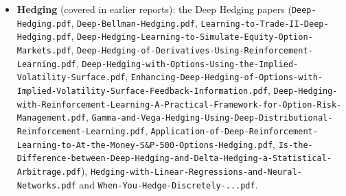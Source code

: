 \documentclass{article}
\begin{document}
\begin{itemize}

\item \textbf{Hedging} (covered in earlier reports): the Deep Hedging papers (\texttt{Deep-\allowbreak{}Hedging.\allowbreak{}pdf}, \texttt{Deep-\allowbreak{}Bellman-\allowbreak{}Hedging.\allowbreak{}pdf}, \texttt{Learning-\allowbreak{}to-\allowbreak{}Trade-\allowbreak{}II-\allowbreak{}Deep-\allowbreak{}Hedging.\allowbreak{}pdf}, \texttt{Deep-\allowbreak{}Hedging-\allowbreak{}Learning-\allowbreak{}to-\allowbreak{}Simulate-\allowbreak{}Equity-\allowbreak{}Option-\allowbreak{}Markets.\allowbreak{}pdf}, \texttt{Deep-\allowbreak{}Hedging-\allowbreak{}of-\allowbreak{}Derivatives-\allowbreak{}Using-\allowbreak{}Reinforcement-\allowbreak{}Learning.\allowbreak{}pdf}, \texttt{Deep-\allowbreak{}Hedging-\allowbreak{}with-\allowbreak{}Options-\allowbreak{}Using-\allowbreak{}the-\allowbreak{}Implied-\allowbreak{}Volatility-\allowbreak{}Surface.\allowbreak{}pdf}, \texttt{Enhancing-\allowbreak{}Deep-\allowbreak{}Hedging-\allowbreak{}of-\allowbreak{}Options-\allowbreak{}with-\allowbreak{}Implied-\allowbreak{}Volatility-\allowbreak{}Surface-\allowbreak{}Feedback-\allowbreak{}Information.\allowbreak{}pdf}, \texttt{Deep-\allowbreak{}Hedging-\allowbreak{}with-\allowbreak{}Reinforcement-\allowbreak{}Learning-\allowbreak{}A-\allowbreak{}Practical-\allowbreak{}Framework-\allowbreak{}for-\allowbreak{}Option-\allowbreak{}Risk-\allowbreak{}Management.\allowbreak{}pdf}, \texttt{Gamma-\allowbreak{}and-\allowbreak{}Vega-\allowbreak{}Hedging-\allowbreak{}Using-\allowbreak{}Deep-\allowbreak{}Distributional-\allowbreak{}Reinforcement-\allowbreak{}Learning.\allowbreak{}pdf}, \texttt{Application-\allowbreak{}of-\allowbreak{}Deep-\allowbreak{}Reinforcement-\allowbreak{}Learning-\allowbreak{}to-\allowbreak{}At-\allowbreak{}the-\allowbreak{}Money-\allowbreak{}S\&P-\allowbreak{}500-\allowbreak{}Options-\allowbreak{}Hedging.\allowbreak{}pdf}, \texttt{Is-\allowbreak{}the-\allowbreak{}Difference-\allowbreak{}between-\allowbreak{}Deep-\allowbreak{}Hedging-\allowbreak{}and-\allowbreak{}Delta-\allowbreak{}Hedging-\allowbreak{}a-\allowbreak{}Statistical-\allowbreak{}Arbitrage.\allowbreak{}pdf}), \texttt{Hedging-\allowbreak{}with-\allowbreak{}Linear-\allowbreak{}Regressions-\allowbreak{}and-\allowbreak{}Neural-\allowbreak{}Networks.\allowbreak{}pdf} and \texttt{When-\allowbreak{}You-\allowbreak{}Hedge-\allowbreak{}Discretely-\allowbreak{}.\allowbreak{}.\allowbreak{}.\allowbreak{}pdf}.


\end{itemize}
\end{document}
